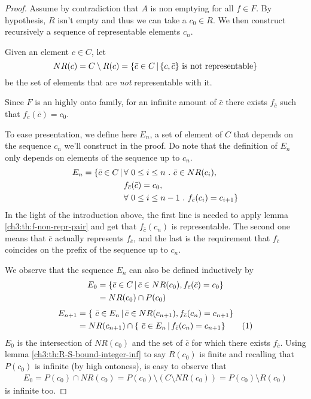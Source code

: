\begin{proof}
	Assume by contradiction that $A$ is non emptying for all $f \in F$. By hypothesis, $R$ isn't empty and thus we can take a $c_0 \in R$. We then construct recursively a sequence of representable elements $c_n$.

	Given an element $c \in C$, let
	\[
	NR(c) = C \setminus R(c) = \{ \bar{c} \in C \,\vert\, \{ c, \bar{c} \} \text{ is not representable} \}
	\]
	be the set of elements that are \textit{not} representable with it.

	Since $F$ is an highly onto family, for an infinite amount of $\bar{c}$ there exists $f_{\bar{c}}$ such that $f_{\bar{c}}(\bar{c}) = c_0$.

	To ease presentation, we define here $E_n$, a set of element of $C$ that depends on the sequence $c_n$ we'll construct in the proof. Do note that the definition of $E_n$ only depends on elements of the sequence up to $c_n$.
	\begin{align*}
		E_n = \{\bar{c} \in C \svert & \forall\ 0 \le i \le n \ .\ \bar{c} \in NR(c_i), \\
		& f_{\bar{c}}(\bar{c}) = c_0, \\
		& \forall\ 0 \le i \le n - 1 \ .\ f_{\bar{c}}(c_i) = c_{i + 1} \}
	\end{align*}
	In the light of the introduction above, the first line is needed to apply lemma \ref{ch3:th:f-non-repr-pair} and get that $f_{\bar{c}}(c_n)$ is representable. The second one means that $\bar{c}$ actually represents $f_{\bar{c}}$, and the last is the requirement that $f_{\bar{c}}$ coincides on the prefix of the sequence up to $c_n$.

	We observe that the sequence $E_n$ can also be defined inductively by
	\begin{align*}
		E_0 &= \{ \bar{c} \in C \,\vert\, \bar{c} \in NR(c_0), f_{\bar{c}}(\bar{c}) = c_0 \} \\
		&= NR(c_0) \cap P(c_0)
	\end{align*}
	\begin{align*}
		E_{n+1} &= \{\ \bar{c} \in E_n \svert \bar{c} \in NR(c_{n+1}), f_{\bar{c}}(c_n) = c_{n+1} \} \\
		&= NR(c_{n+1}) \cap \{\ \bar{c} \in E_n \svert f_{\bar{c}}(c_n) = c_{n+1} \} \addtocounter{equation}{1}\tag{\theequation} \label{ch4:eq:En-relation}
	\end{align*}
	$E_0$ is the intersection of $NR(c_0)$ and the set of $\bar{c}$ for which there exists $f_{\bar{c}}$. Using lemma \ref{ch3:th:R-S-bound-integer-inf} to say $R(c_0)$ is finite and recalling that $P(c_0)$ is infinite (by high ontoness), is easy to observe that
	\begin{align*}
		E_0 = P(c_0) \cap NR(c_0) = P(c_0) \setminus (C \setminus NR(c_0)) = P(c_0) \setminus R(c_0)
	\end{align*}
	is infinite too.


\end{proof}
